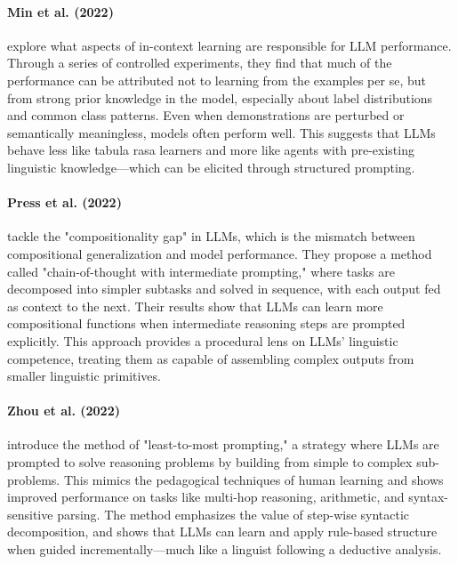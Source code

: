 \paragraph{Min et al. (2022)}
\citet{min2022rethinking} explore what aspects of in-context learning are responsible for LLM performance. Through a series of controlled experiments, they find that much of the performance can be attributed not to learning from the examples per se, but from strong prior knowledge in the model, especially about label distributions and common class patterns. Even when demonstrations are perturbed or semantically meaningless, models often perform well. This suggests that LLMs behave less like tabula rasa learners and more like agents with pre-existing linguistic knowledge---which can be elicited through structured prompting.

\paragraph{Press et al. (2022)}
\citet{press2022measuring} tackle the "compositionality gap" in LLMs, which is the mismatch between compositional generalization and model performance. They propose a method called "chain-of-thought with intermediate prompting," where tasks are decomposed into simpler subtasks and solved in sequence, with each output fed as context to the next. Their results show that LLMs can learn more compositional functions when intermediate reasoning steps are prompted explicitly. This approach provides a procedural lens on LLMs' linguistic competence, treating them as capable of assembling complex outputs from smaller linguistic primitives.

\paragraph{Zhou et al. (2022)}
\citet{zhou2022least} introduce the method of "least-to-most prompting," a strategy where LLMs are prompted to solve reasoning problems by building from simple to complex sub-problems. This mimics the pedagogical techniques of human learning and shows improved performance on tasks like multi-hop reasoning, arithmetic, and syntax-sensitive parsing. The method emphasizes the value of step-wise syntactic decomposition, and shows that LLMs can learn and apply rule-based structure when guided incrementally---much like a linguist following a deductive analysis.